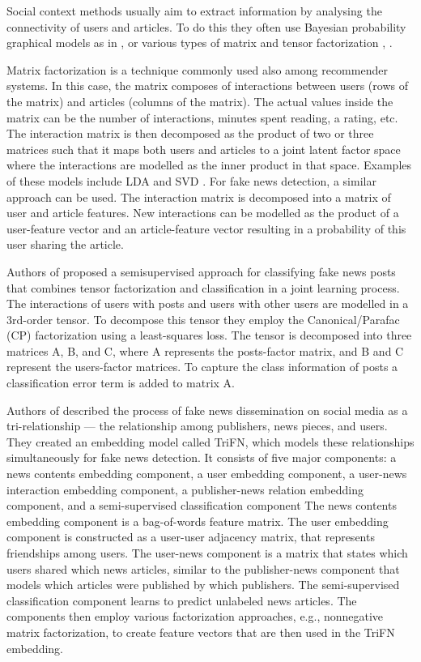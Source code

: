 Social context methods usually aim to extract information by analysing the connectivity of users and articles. To do this they often use Bayesian probability graphical models as in \cite{unsupervised_graph}, or various types of matrix and tensor factorization \cite{tensor_paper}, \cite{trifn}. 

Matrix factorization is a technique commonly used also among recommender systems. In this case, the matrix composes of interactions between users (rows of the matrix) and articles (columns of the matrix). The actual values inside the matrix can be the number of interactions, minutes spent reading, a rating, etc. The interaction matrix is then decomposed as the product of two or three matrices such that it maps both users and articles to a joint latent factor space where the interactions are modelled as the inner product in that space. Examples of these models include LDA \cite{lda} and SVD \cite{svd}.
For fake news detection, a similar approach can be used. The interaction matrix is decomposed into a matrix of user and article features. New interactions can be modelled as the product of a user-feature vector and an article-feature vector resulting in a probability of this user sharing the article. 

Authors of \cite{tensor_paper} proposed a semisupervised approach for classifying fake news posts that combines tensor factorization and classification in a joint learning process. The interactions of users with posts and users with other users are modelled in a 3rd-order tensor. To decompose this tensor they employ the Canonical/Parafac (CP) factorization \cite{parafac} using a least-squares loss. The tensor is decomposed into three matrices A, B, and C, where A represents the posts-factor matrix, and B and C represent the users-factor matrices. To capture the class information of posts a classification error term is added to matrix A.

Authors of \cite{trifn} described the process of fake news dissemination on social media as a tri-relationship --- the relationship among publishers, news pieces, and users. They created an embedding model called TriFN, which models these relationships simultaneously for fake news detection.
It consists of five major components: a news contents embedding component, a user embedding component, a user-news interaction embedding component, a publisher-news relation embedding component, and a semi-supervised classification component
The news contents embedding component is a bag-of-words feature matrix. The user embedding component is constructed as a user-user adjacency matrix, that represents friendships among users. The user-news component is a matrix that states which users shared which news articles, similar to the publisher-news component that models which articles were published by which publishers. The semi-supervised classification component learns to predict unlabeled news articles. The components then employ various factorization approaches, e.g., nonnegative matrix factorization, to create feature vectors that are then used in the TriFN embedding. 

